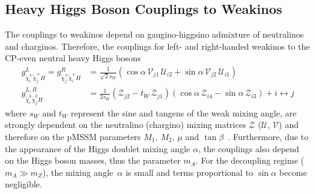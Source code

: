 \documentclass[11pt,a4paper]{article}
\begin{document}
\subsection*{Heavy Higgs Boson Couplings to Weakinos}
The couplings to weakinos depend on gaugino-higgsino admixture of neutralinos and charginos. Therefore, the couplings for left- and right-handed weakinos to the CP-even neutral heavy Higgs bosons
\begin{align}
g^L_{\tilde{\chi}^\pm_i\tilde{\chi}^\mp_jH} = g^R_{\tilde{\chi}^\pm_j\tilde{\chi}^\mp_iH} &= \frac{1}{\sqrt{2}s_W}\left(\cos\alpha \, \mathcal{V}_{j1} \,\mathcal{U}_{i2} + \sin\alpha \, \mathcal{V}_{j2} \, \mathcal{U}_{i1}\right)\\
g^{L,R}_{\tilde{\chi}^0_i\tilde{\chi}^0_jH} &= \frac{1}{2s_W}\left(\mathcal{Z}_{j2} - t_W \, \mathcal{Z}_{j1}\right)\left(\cos\alpha \, \mathcal{Z}_{i4} - \sin\alpha \, \mathcal{Z}_{i3}\right) + i \leftrightarrow j
\end{align}
\noindent
where $s_W$ and $t_W$ represent the sine and tangens of the weak mixing angle, are strongly dependent on the neutralino (chargino) mixing matrices $\mathcal{Z}$ ($\mathcal{U}$, $\mathcal{V}$) and therefore on the pMSSM parameters $M_1$, $M_2$, $\mu$ and $\tan\beta$~\cite{Gunion:1989we, Drees:873465}. Furthermore, due to the appearance of the Higgs doublet mixing angle $\alpha$, the couplings also depend on the Higgs boson masses, thus the parameter $m_A$. For the decoupling regime ($m_A \gg m_Z$), the mixing angle~$\alpha$ is small and terms proportional to $\sin\alpha$ become negligible.
\end{document}
